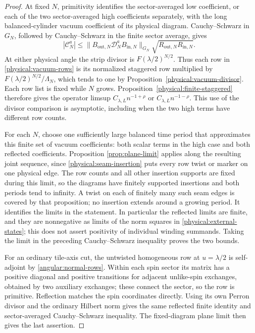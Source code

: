 \begin{proof}
At fixed \(N\), primitivity identifies the sector-averaged low coefficient,
or each of the two sector-averaged high coefficients separately, with the
long balanced-cylinder vacuum coefficient of its physical diagram.
Cauchy--Schwarz in \(G_N\), followed
by Cauchy--Schwarz in the finite sector average, gives
\[
 |\mathcal C_N^a|
 \le\|B_{\mathrm{out},N}\mathcal D_N^a B_{\mathrm{in},N}\|_{G_N}
       \sqrt{R_{\mathrm{out},N}R_{\mathrm{in},N}}.
\]
At either physical angle the strip divisor is \(F(\lambda/2)^{N/2}\).
Thus each row in \eqref{physical:vacuum-rows} is its normalized staggered
row multiplied by \(F(\lambda/2)^{N/2}/\Lambda_N\), which tends to one
by Proposition~\ref{physical:vacuum-divisor}.  Each row list is fixed
while \(N\) grows.  Proposition~\ref{physical:finite-staggered} therefore
gives the operator limsup \(C_{\lambda,L}n^{-1+\rho}\) or
\(C_{\lambda,L}n^{-1-\rho}\).  This use of the divisor comparison is
asymptotic, including when the two high terms have different row counts.

For each \(N\), choose one sufficiently large balanced time period that
approximates this finite set of vacuum coefficients: both scalar terms
in the high case and both reflected coefficients.  Proposition
\ref{prop:plane-limit} applies along the resulting joint sequence, since
\eqref{physical:seam-insertion} puts every row twist or marker on one
physical edge. The row counts and all other insertion supports are
fixed during this limit, so the diagrams have finitely supported
insertions and both periods tend to infinity. A twist on each of
finitely many such seam edges is covered by that proposition; no
insertion extends around a growing period. It identifies the limits
in the statement. In
particular the reflected limits are finite, and they are nonnegative as
limits of the norm squares in \eqref{physical:external-states}; this does
not assert positivity of individual winding summands.  Taking the limit
in the preceding Cauchy--Schwarz inequality proves the two bounds.

For an ordinary tile-axis cut, the untwisted homogeneous row at
\(u=\lambda/2\) is self-adjoint by \eqref{angular:normal-rows}.  Within
each spin sector its matrix has a positive diagonal and positive
transitions for adjacent unlike-spin exchanges, obtained by two auxiliary
exchanges; these connect the sector, so the row is primitive.  Reflection
matches the spin coordinates directly.  Using its own Perron divisor and
the ordinary Hilbert norm gives the same reflected finite identity and
sector-averaged Cauchy--Schwarz inequality.  The fixed-diagram plane limit
then gives the last assertion.
\end{proof}

